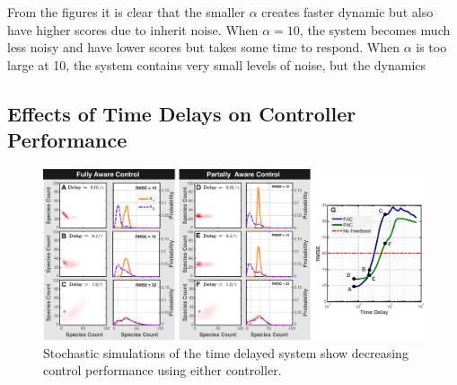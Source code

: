 \documentclass[12pt]{article}
\begin{document}
From the figures it is clear that the smaller $\alpha$ creates faster dynamic but also have higher scores due to inherit noise. When $\alpha = 10$, the system becomes much less noisy and have lower scores but takes some time to respond. When $\alpha$ is too large at 10, the system contains very small levels of noise, but the dynamics


\subsection{Effects of Time Delays on Controller Performance}
\begin{figure}
\begin{center}
\includegraphics[width=1\textwidth]{TimeDelayPerturbation.pdf}
\vspace{-0.1in}
\caption{Stochastic simulations of the time delayed system show decreasing control performance using either controller. }
\label{Time}
\end{center}
\vspace{-0.2in}
\end{figure}
\end{document}
